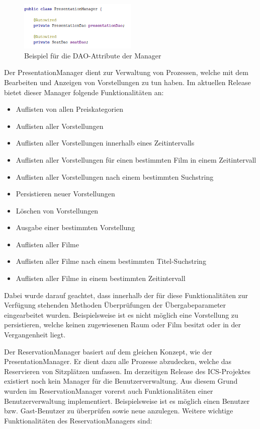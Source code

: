 	\begin{figure}[H]
		\centering 
		\includegraphics[width=0.5\textwidth]{img/manager_dao}
		\captionsetup{format=hang}
		\caption[Beispiel für die \ac{DAO}-Attribute der Manager]{\label{fig:manager_dao}Beispiel für die \ac{DAO}-Attribute der Manager}
	\end{figure}	
	
	
	Der PresentationManager dient zur Verwaltung von Prozessen, welche mit dem Bearbeiten und Anzeigen von Vorstellungen zu tun haben. Im aktuellen Release bietet dieser Manager folgende Funktionalitäten an:
	
	\begin{itemize}
		\setlength\itemsep{-0.5em}
		\item Auflisten von allen Preiskategorien
		\item Auflisten aller Vorstellungen
	    \item Auflisten aller Vorstellungen innerhalb eines Zeitintervalls
		\item Auflisten aller Vorstellungen für einen bestimmten Film in einem Zeitintervall
		\item Auflisten aller Vorstellungen nach einem bestimmten Suchstring
		\item Persistieren neuer Vorstellungen
		\item Löschen von Vorstellungen
		\item Ausgabe einer bestimmten Vorstellung
		\item Auflisten aller Filme
		\item Auflisten aller Filme nach einem bestimmten Titel-Suchstring
		\item Auflisten aller Filme in einem bestimmten Zeitintervall
	\end{itemize}

	Dabei wurde darauf geachtet, dass innerhalb der für diese Funktionalitäten zur Verfügung stehenden Methoden Überprüfungen der Übergabeparameter eingearbeitet wurden. Beispielsweise ist es nicht möglich eine Vorstellung zu persistieren, welche keinen zugewiesenen Raum oder Film besitzt oder in der Vergangenheit liegt.
	
	Der ReservationManager basiert auf dem gleichen Konzept, wie der PresentationManager. Er dient dazu alle Prozesse abzudecken, welche das Reservieren von Sitzplätzen umfassen. Im derzeitigen Release des \ac{ICS}-Projektes existiert noch kein Manager für die Benutzerverwaltung. Aus diesem Grund wurden im ReservationManager vorerst auch Funktionalitäten einer Benutzerverwaltung implementiert. Beispielsweise ist es möglich einen Benutzer bzw. Gast-Benutzer zu überprüfen sowie neue anzulegen. Weitere wichtige Funktionalitäten des ReservationManagers sind: 
	
